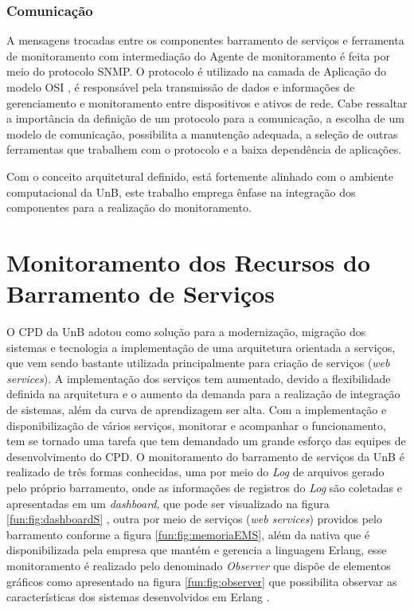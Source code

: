\subsubsection{Comunicação}

A mensagens trocadas entre os componentes barramento de serviços e ferramenta de monitoramento com intermediação do Agente de monitoramento é feita por meio do protocolo \acrshort{SNMP}. O protocolo é utilizado na camada de Aplicação do modelo OSI \cite{tanenbaum2003redes}, é responsável pela transmissão de dados e informações de gerenciamento e monitoramento entre dispositivos e ativos de rede. Cabe ressaltar a importância da definição de um protocolo para a comunicação, a escolha de um modelo de comunicação, possibilita a manutenção adequada, a seleção de outras ferramentas que trabalhem com o protocolo e a baixa dependência de aplicações.     

Com o conceito arquitetural definido, está fortemente alinhado com o ambiente computacional da \acrshort{UnB}, este trabalho emprega ênfase na integração dos componentes para a realização do monitoramento.   

\section{Monitoramento dos Recursos do Barramento de Serviços}%
\label{recursos_monitoramento}

O \acrshort{CPD} da \acrshort{UnB} adotou como solução para a modernização, migração dos sistemas e tecnologia a implementação de uma arquitetura orientada a serviços, que vem sendo bastante utilizada principalmente para criação de serviços (\textit{web services}). A implementação dos serviços tem aumentado, devido a flexibilidade definida na arquitetura e o aumento da demanda para a realização de integração de sistemas, além da curva de aprendizagem ser alta. Com a implementação e disponibilização de  vários serviços, monitorar e acompanhar o funcionamento, tem se tornado uma tarefa que tem demandado um grande esforço das equipes de 
desenvolvimento do \acrshort{CPD}. O monitoramento do barramento de serviços da \acrshort{UnB} é realizado de três formas conhecidas, uma por meio do \textit{Log} de arquivos gerado pelo próprio barramento, onde as informações de registros do \textit{Log} são coletadas e apresentadas em um \textit{dashboard}, que pode ser visualizado na figura \ref{fun:fig:dashboardS} \cite{filgueirasmonitoramento}, outra por meio de serviços (\textit{web services}) providos pelo barramento conforme a figura \ref{fun:fig:memoriaEMS}, além da nativa que é disponibilizada pela empresa que mantém e gerencia a linguagem Erlang, esse monitoramento é realizado pelo denominado \textit{Observer} que dispõe de elementos gráficos como apresentado na figura \ref{fun:fig:observer} que possibilita observar as características dos sistemas desenvolvidos em Erlang \cite{ericssonAB2002-2019}. 

